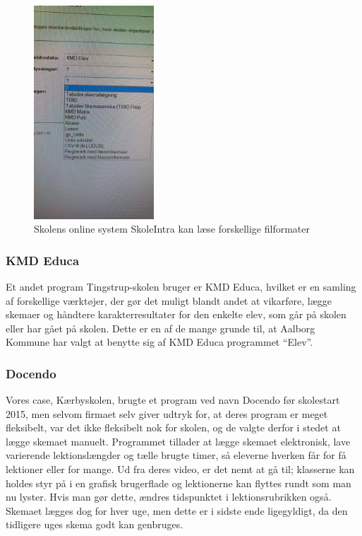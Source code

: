 \begin{figure}[h!]
	\centering
	\includegraphics[width=0.4\textwidth]{../Billeder/Skemaimportering_filtyper_Intra.jpg}
	\caption{Skolens online system SkoleIntra kan læse forskellige filformater}
	\label{fig:kompatibleFiltyper}
\end{figure}
\FloatBarrier
\subsubsection{KMD Educa}
Et andet program Tingstrup-skolen bruger er KMD Educa, hvilket er en samling af forskellige værktøjer\cite{KMD}, der gør det muligt blandt andet at vikarføre, lægge skemaer og håndtere karakterresultater for den enkelte elev, som går på skolen eller har gået på skolen. Dette er en af de mange grunde til, at Aalborg Kommune har valgt at benytte sig af KMD Educa programmet ``Elev''\cite{useCase_KMD_Educa_Elev}.

\subsubsection{Docendo}
Vores case, Kærbyskolen, brugte et program ved navn Docendo før skolestart 2015, men selvom firmaet selv giver udtryk for, at deres program er meget fleksibelt\cite{Docendo}, var det ikke fleksibelt nok for skolen, og de valgte derfor i stedet at lægge skemaet manuelt. Programmet tillader at lægge skemaet elektronisk, lave varierende lektionslængder og tælle brugte timer, så eleverne hverken får for få lektioner eller for mange. Ud fra deres video\cite{Docendo_video}, er det nemt at gå til; klasserne kan holdes styr på i en grafisk brugerflade og lektionerne kan flyttes rundt som man nu lyster. Hvis man gør dette, ændres tidspunktet i lektionsrubrikken også. Skemaet lægges dog for hver uge, men dette er i sidste ende ligegyldigt, da den tidligere uges skema godt kan genbruges.

